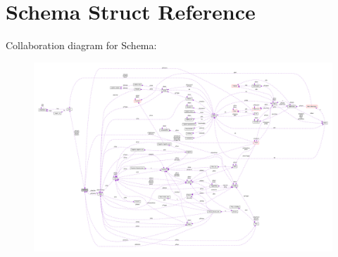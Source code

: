 \hypertarget{structSchema}{}\section{Schema Struct Reference}
\label{structSchema}


Collaboration diagram for Schema\+:\nopagebreak
\begin{figure}[H]
\begin{center}
\leavevmode
\includegraphics[width=350pt]{structSchema__coll__graph}
\end{center}
\end{figure}
